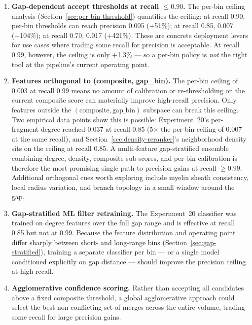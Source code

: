 \begin{enumerate}
  \item \textbf{Gap-dependent accept thresholds at recall $\leq 0.90$.}
        The per-bin ceiling analysis (Section~\ref{sec:per-bin-threshold})
        quantifies the ceiling: at recall 0.90, per-bin thresholds can
        reach precision 0.005 (+51\%); at recall 0.85, 0.007 (+104\%);
        at recall 0.70, 0.017 (+421\%).  These are concrete deployment
        levers for use cases where trading some recall for precision is
        acceptable.  At recall 0.99, however, the ceiling is only $+$1.3\%
        --- so a per-bin policy is \emph{not} the right tool at the pipeline's
        current operating point.

  \item \textbf{Features orthogonal to (composite, gap\_bin).}
        The per-bin ceiling of 0.003 at recall 0.99 means no amount
        of calibration or re-thresholding on the current composite score
        can materially improve high-recall precision.  Only features
        outside the \((\text{composite}, \text{gap\_bin})\) subspace can
        break this ceiling.  Two empirical data points show this is
        possible: Experiment~20's per-fragment degree reached 0.037 at
        recall 0.85 (5$\times$ the per-bin ceiling of 0.007 at
        the same recall), and Section~\ref{sec:density-reranker}'s
        neighborhood density sits on the ceiling at recall 0.85.  A
        multi-feature gap-stratified ensemble combining degree, density,
        composite sub-scores, and per-bin calibration is therefore the
        most promising single path to precision gains at recall $\geq 0.99$.
        Additional orthogonal cues worth exploring include myelin sheath
        consistency, local radius variation, and branch topology in a
        small window around the gap.

  \item \textbf{Gap-stratified ML filter retraining.} The Experiment~20
        classifier was trained on degree features over the full gap range
        and is effective at recall 0.85 but not at 0.99.  Because the
        feature distribution and operating point differ sharply between
        short- and long-range bins (Section~\ref{sec:gap-stratified}),
        training a separate classifier per bin --- or a single model
        conditioned explicitly on gap distance --- should improve the
        precision ceiling at high recall.

  \item \textbf{Agglomerative confidence scoring.} Rather than accepting all
        candidates above a fixed composite threshold, a global agglomerative
        approach could select the best non-conflicting set of merges across the
        entire volume, trading some recall for large precision gains.
\end{enumerate}

